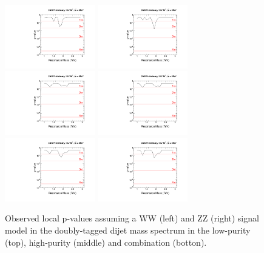\begin{figure}[h!tpb]
\begin{center}
\includegraphics[width=0.35\textwidth]{figs/limits/pvalue_RS1WW_low_purity.pdf}
\includegraphics[width=0.35\textwidth]{figs/limits/pvalue_RS1ZZ_low_purity.pdf}\\
\includegraphics[width=0.35\textwidth]{figs/limits/pvalue_RS1WW_high_purity.pdf}
\includegraphics[width=0.35\textwidth]{figs/limits/pvalue_RS1ZZ_high_purity.pdf}\\
\includegraphics[width=0.35\textwidth]{figs/limits/pvalue_RS1WW_combined.pdf}
\includegraphics[width=0.35\textwidth]{figs/limits/pvalue_RS1ZZ_combined.pdf}
\end{center}
\caption{Observed local p-values assuming a \GRS WW (left) and \GRS ZZ (right) signal model in the doubly-tagged dijet mass spectrum in the low-purity (top), high-purity (middle) and combination (botton).}
\label{fig:Vtagresults5}
\end{figure}


